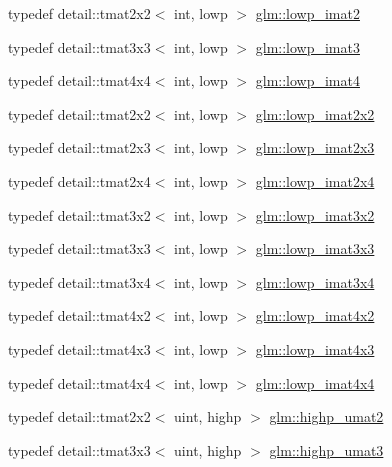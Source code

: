 \begin{DoxyCompactItemize}
\item 
typedef detail\+::tmat2x2$<$ int, lowp $>$ \hyperlink{group__gtc__matrix__integer_gae0df4bc278c1a958a32af9ac82c47630}{glm\+::lowp\+\_\+imat2}
\item 
typedef detail\+::tmat3x3$<$ int, lowp $>$ \hyperlink{group__gtc__matrix__integer_ga149b90591e7275193c85cc08acbf0024}{glm\+::lowp\+\_\+imat3}
\item 
typedef detail\+::tmat4x4$<$ int, lowp $>$ \hyperlink{group__gtc__matrix__integer_ga7c687f14d923e05d5cf14aac41d10993}{glm\+::lowp\+\_\+imat4}
\item 
typedef detail\+::tmat2x2$<$ int, lowp $>$ \hyperlink{group__gtc__matrix__integer_ga05307630bc68a62132a82d1886a0b5e2}{glm\+::lowp\+\_\+imat2x2}
\item 
typedef detail\+::tmat2x3$<$ int, lowp $>$ \hyperlink{group__gtc__matrix__integer_ga5757953c508a6e05bf3573d6c099cf88}{glm\+::lowp\+\_\+imat2x3}
\item 
typedef detail\+::tmat2x4$<$ int, lowp $>$ \hyperlink{group__gtc__matrix__integer_ga4d859ef48cdfb15b2c9acc98064dd272}{glm\+::lowp\+\_\+imat2x4}
\item 
typedef detail\+::tmat3x2$<$ int, lowp $>$ \hyperlink{group__gtc__matrix__integer_ga250780f2be05f698b881b04ba7ce0452}{glm\+::lowp\+\_\+imat3x2}
\item 
typedef detail\+::tmat3x3$<$ int, lowp $>$ \hyperlink{group__gtc__matrix__integer_gae0d6068aaf9b1f8f06c6cc32941f9471}{glm\+::lowp\+\_\+imat3x3}
\item 
typedef detail\+::tmat3x4$<$ int, lowp $>$ \hyperlink{group__gtc__matrix__integer_gaba7c2c9f782278aaa10dad882d73ef0d}{glm\+::lowp\+\_\+imat3x4}
\item 
typedef detail\+::tmat4x2$<$ int, lowp $>$ \hyperlink{group__gtc__matrix__integer_ga0d7055814ab969df3b844ba9c52dbf61}{glm\+::lowp\+\_\+imat4x2}
\item 
typedef detail\+::tmat4x3$<$ int, lowp $>$ \hyperlink{group__gtc__matrix__integer_ga73858cf965b0aa7e72908eb817c192d6}{glm\+::lowp\+\_\+imat4x3}
\item 
typedef detail\+::tmat4x4$<$ int, lowp $>$ \hyperlink{group__gtc__matrix__integer_ga92339a0b053a721e3b88267e6d175014}{glm\+::lowp\+\_\+imat4x4}
\item 
typedef detail\+::tmat2x2$<$ uint, highp $>$ \hyperlink{group__gtc__matrix__integer_ga0c89800e3f63f82da4a4159004811cec}{glm\+::highp\+\_\+umat2}
\item 
typedef detail\+::tmat3x3$<$ uint, highp $>$ \hyperlink{group__gtc__matrix__integer_ga2a271939d0123103f088e325e5123385}{glm\+::highp\+\_\+umat3}

\end{DoxyCompactItemize}

